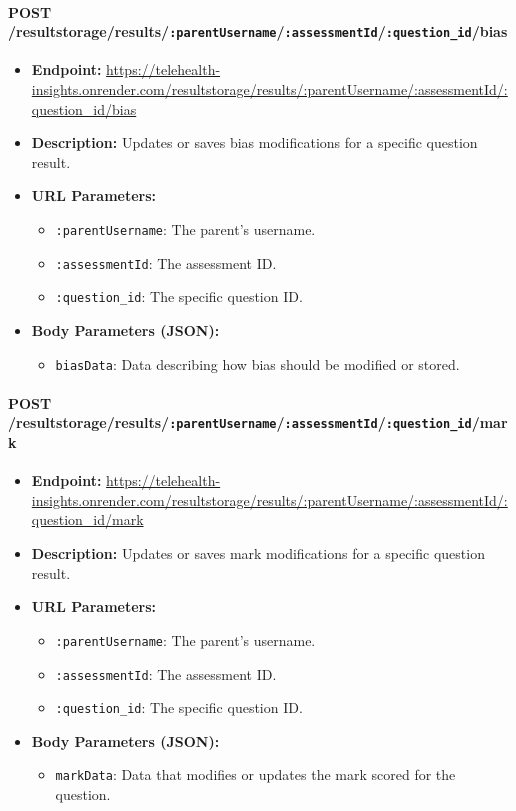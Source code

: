 \documentclass{article}
\begin{document}
  \paragraph{POST /resultstorage/results/\texttt{:parentUsername}/\texttt{:assessmentId}/\texttt{:question\_id}/bias}
  \begin{itemize}
      \item \textbf{Endpoint:} 
          \url{https://telehealth-insights.onrender.com/resultstorage/results/:parentUsername/:assessmentId/:question_id/bias}
      \item \textbf{Description:} Updates or saves bias modifications for a specific 
            question result.
      \item \textbf{URL Parameters:}
      \begin{itemize}
          \item \texttt{:parentUsername}: The parent’s username.
          \item \texttt{:assessmentId}: The assessment ID.
          \item \texttt{:question\_id}: The specific question ID.
      \end{itemize}
      \item \textbf{Body Parameters (JSON):}
      \begin{itemize}
          \item \texttt{biasData}: Data describing how bias should be modified or stored.
      \end{itemize}
  \end{itemize}
  
  \paragraph{POST /resultstorage/results/\texttt{:parentUsername}/\texttt{:assessmentId}/\texttt{:question\_id}/mark}
  \begin{itemize}
      \item \textbf{Endpoint:} 
          \url{https://telehealth-insights.onrender.com/resultstorage/results/:parentUsername/:assessmentId/:question_id/mark}
      \item \textbf{Description:} Updates or saves mark modifications for a specific 
            question result.
      \item \textbf{URL Parameters:}
      \begin{itemize}
          \item \texttt{:parentUsername}: The parent’s username.
          \item \texttt{:assessmentId}: The assessment ID.
          \item \texttt{:question\_id}: The specific question ID.
      \end{itemize}
      \item \textbf{Body Parameters (JSON):}
      \begin{itemize}
          \item \texttt{markData}: Data that modifies or updates the mark 
                scored for the question.
      \end{itemize}
  \end{itemize}
  
\end{document}
